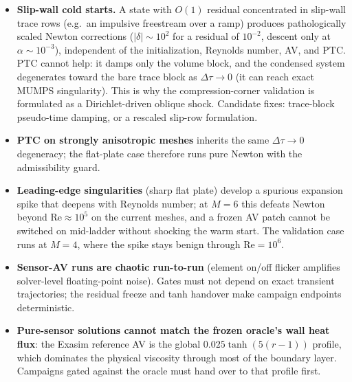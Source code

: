 \documentclass[11pt]{article}
\begin{document}
\begin{itemize}
  \item \textbf{Slip-wall cold starts.} A state with $O(1)$ residual
        concentrated in slip-wall trace rows (e.g.\ an impulsive
        freestream over a ramp) produces pathologically scaled Newton
        corrections ($|\delta| \sim 10^2$ for a residual of $10^{-2}$,
        descent only at $\alpha \sim 10^{-3}$), independent of the
        initialization, Reynolds number, AV, and PTC. PTC cannot help:
        it damps only the volume block, and the condensed system
        degenerates toward the bare trace block as
        $\Delta\tau \to 0$ (it can reach exact MUMPS singularity).
        This is why the compression-corner validation is formulated as
        a Dirichlet-driven oblique shock. Candidate fixes: trace-block
        pseudo-time damping, or a rescaled slip-row formulation.
  \item \textbf{PTC on strongly anisotropic meshes} inherits the same
        $\Delta\tau \to 0$ degeneracy; the flat-plate case therefore
        runs pure Newton with the admissibility guard.
  \item \textbf{Leading-edge singularities} (sharp flat plate) develop
        a spurious expansion spike that deepens with Reynolds number;
        at $M = 6$ this defeats Newton beyond
        $\mathrm{Re} \approx 10^5$ on the current meshes, and a frozen
        AV patch cannot be switched on mid-ladder without shocking the
        warm start. The validation case runs at $M = 4$, where the
        spike stays benign through $\mathrm{Re} = 10^6$.
  \item \textbf{Sensor-AV runs are chaotic run-to-run} (element on/off
        flicker amplifies solver-level floating-point noise). Gates
        must not depend on exact transient trajectories; the residual
        freeze and tanh handover make campaign endpoints deterministic.
  \item \textbf{Pure-sensor solutions cannot match the frozen oracle's
        wall heat flux}: the Exasim reference AV is the global
        $0.025\tanh(5(r-1))$ profile, which dominates the physical
        viscosity through most of the boundary layer. Campaigns gated
        against the oracle must hand over to that profile first.
\end{itemize}
\end{document}
